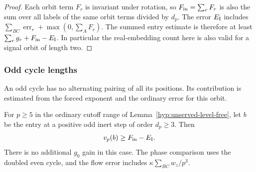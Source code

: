 \begin{proof}
Each orbit term \(F_r\) is invariant under rotation, so
\(F_{\rm in}=\sum_r F_r\) is also the sum over all labels of
the same orbit terms divided by \(d_p\). The error
\(E_{\rm I}\) includes \(\sum_{BC}\operatorname{err}_r+
\max(0,\sum_A F_r)\). The summed entry estimate is therefore
at least \(\sum_r g_r+F_{\rm in}-E_{\rm I}\). In particular
the real-embedding count here is also valid for a signal
orbit of length two.

\end{proof}

\subsubsection{Odd cycle lengths}

An odd cycle has no alternating pairing of all its positions. Its contribution is estimated from the forced exponent and the ordinary error for this orbit.

\begin{proposition}\label{prop:unserved-odd-entries}
For \(p\ge5\) in the ordinary cutoff range of Lemma~\ref{hyp:unserved-level-free}, let \(b\) be the entry at a positive odd inert step of order \(d_p\ge3\). Then
\[
 v_p(b)\ge F_{\rm in}-E_{\rm I}.
\]
 There is no additional \(g_0\) gain
in this case. The phase comparison uses the doubled even cycle,
and the flow error includes \(\kappa\sum_{BC}w_z/p^3\).
\end{proposition}

